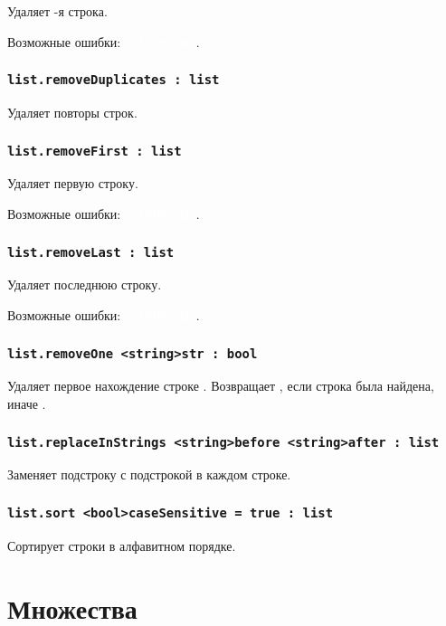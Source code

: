 \documentclass[a4paper, 14pt]{extarticle}
\newcommand{\ferror}[1]{{\fontsize{11pt}{12pt} \tt \colorbox{function}{\textcolor{white}{#1}}}}
\begin{document}
Удаляет -я строка.

Возможные ошибки: \ferror{OutOfBounds}.

\subsubsection{\lstinline|list.removeDuplicates : list|}

Удаляет повторы строк.

\subsubsection{\lstinline|list.removeFirst : list|}

Удаляет первую строку.

Возможные ошибки: \ferror{OutOfBounds}.

\subsubsection{\lstinline|list.removeLast : list|}

Удаляет последнюю строку.

Возможные ошибки: \ferror{OutOfBounds}.

\subsubsection{\lstinline|list.removeOne <string>str : bool|}

Удаляет первое нахождение строке . Возвращает \true, если строка была найдена, иначе \false.

\subsubsection{\lstinline|list.replaceInStrings <string>before <string>after : list|}

Заменяет подстроку  с подстрокой  в каждом строке.

\subsubsection{\lstinline|list.sort <bool>caseSensitive = true : list|}

Сортирует строки в алфавитном порядке.

\newpage
\section{Множества}
\end{document}
